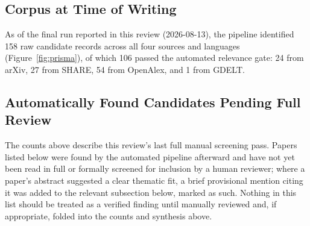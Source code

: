 \documentclass[11pt]{article}
\begin{document}
\subsection{Corpus at Time of Writing}

As of the final run reported in this review (2026-08-13), the pipeline identified 158 raw candidate records across all four sources and languages (Figure~\ref{fig:prisma}), of which 106 passed the automated relevance gate: 24 from arXiv, 27 from SHARE, 54 from OpenAlex, and 1 from GDELT.

\subsection{Automatically Found Candidates Pending Full Review}
\label{sec:auto_pending}

The counts above describe this review's last full manual screening pass. Papers listed below were found by the automated pipeline afterward and have not yet been read in full or formally screened for inclusion by a human reviewer; where a paper's abstract suggested a clear thematic fit, a brief provisional mention citing it was added to the relevant subsection below, marked as such. Nothing in this list should be treated as a verified finding until manually reviewed and, if appropriate, folded into the counts and synthesis above.
\end{document}
